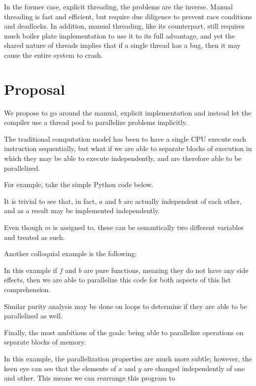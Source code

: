 \documentclass{article}
\begin{document}
\begin{multicols}{2}
In the former case, explicit threading, the problems are the inverse.
Manual threading is fast and efficient, but require due diligence to 
prevent race conditions and deadlocks. In addition, manual threading,
like its counterpart, still requires much boiler plate implementation
to use it to its full advantage, and yet the shared nature of threads
implies that if a single thread has a bug, then it may cause the entire
system to crash.

\section*{Proposal}

We propose to go around the manual, explicit implementation and instead
let the compiler use a thread pool to parallelize problems implicitly.

The traditional computation model has been to have a single CPU execute
each instruction sequentially, but what if we are able to separate blocks
of execution in which they may be able to execute independently, and are
therefore able to be parallelized.

For example, take the simple Python code below.


It is trivial to see that, in fact, $a$ and $b$ are actually independent of
each other, and as a result may be implemented independently.

Even though $m$ is assigned to, these can be semantically two different variables
and treated as such.

Another colloquial example is the following: 


In this example if $f$ and $b$ are pure functions, meaning they do not have any
side effects, then we are able to parallelize this code for both aspects of this
list comprehension.

Similar purity analysis may be done on loops to determine if they are able to
be parallelized as well.

Finally, the most ambitious of the goals: being able to parallelize operations on
separate blocks of memory.


In this example, the parallelization properties are much more subtle; however, the
keen eye can see that the elements of $x$ and $y$ are changed independently of one
and other. This means we can rearrange this program to 


\end{multicols}
\end{document}
